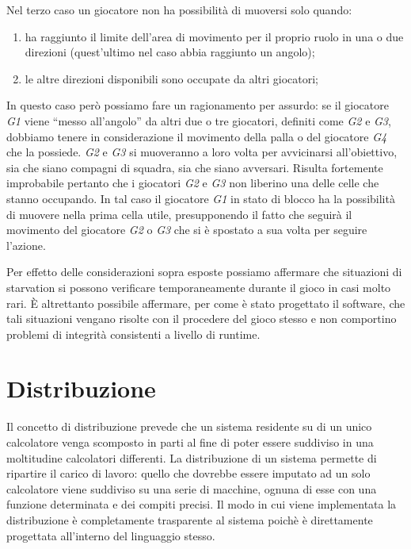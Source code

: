 \documentclass[aps,letterpaper,10pt]{article}
\begin{document}
Nel terzo caso un giocatore non ha possibilit\`a di muoversi solo quando:

\begin{enumerate}
\item ha raggiunto il limite dell'area di movimento per il proprio ruolo in una o due direzioni (quest'ultimo nel caso
abbia raggiunto un angolo);
	\item le altre direzioni disponibili sono occupate da altri giocatori; 
\end{enumerate}

In questo caso per\`o possiamo fare un ragionamento per assurdo: se il giocatore \emph{G1} viene ``messo all'angolo'' da
altri due o tre giocatori, definiti come \emph{G2} e \emph{G3}, dobbiamo tenere in considerazione il movimento della
palla o del giocatore \emph{G4} che la possiede. \emph{G2} e \emph{G3} si muoveranno a loro volta per avvicinarsi
all'obiettivo, sia che siano compagni di squadra, sia che siano avversari. Risulta fortemente improbabile pertanto che i
giocatori \emph{G2} e \emph{G3} non liberino una delle celle che stanno occupando. In tal caso il giocatore \emph{G1} in
stato di blocco ha la possibilit\`a di muovere nella prima cella utile, presupponendo il fatto che seguir\`a il
movimento del giocatore \emph{G2} o \emph{G3} che si \`e spostato a sua volta per seguire l'azione. \vspace{3mm}

Per effetto delle considerazioni sopra esposte possiamo affermare che situazioni di starvation si possono verificare
temporaneamente durante il gioco in casi molto rari. \`E altrettanto possibile affermare, per come \`e stato progettato
il software, che tali situazioni vengano risolte con il procedere del gioco stesso e non comportino problemi di
integrit\`a consistenti a livello di runtime.

\newpage

\section{Distribuzione}

Il concetto di distribuzione prevede che un sistema residente su di un unico calcolatore venga scomposto in parti al
fine di poter essere suddiviso in una moltitudine calcolatori differenti. La distribuzione di un sistema permette di
ripartire il carico di lavoro: quello che dovrebbe essere imputato ad un solo calcolatore viene suddiviso su una serie
di macchine, ognuna di esse con una funzione determinata e dei compiti precisi. Il modo in cui viene implementata la
distribuzione \`e completamente trasparente al sistema poich\`e \`e direttamente progettata all'interno del linguaggio
stesso. \vspace{3mm}
\end{document}
